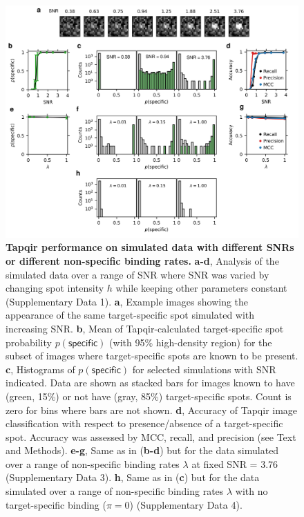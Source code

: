 \begin{figure}[h]
\centering
\includegraphics[width=1\textwidth]{figures/figure5/figure5.png}
\caption{\textbf{Tapqir performance on simulated data with different SNRs or different non-specific binding rates.} \textbf{a-d}, Analysis of the simulated data over a range of SNR where SNR was varied by changing spot intensity  $h$ while keeping other parameters constant (Supplementary Data 1). \textbf{a}, Example images showing the appearance of the same target-specific spot simulated with increasing SNR.   \textbf{b}, Mean of Tapqir-calculated target-specific spot probability $p(\mathsf{specific})$ (with 95\% high-density region) for the subset of images where target-specific spots  are known to be present. \textbf{c}, Histograms of $p(\mathsf{specific})$ for selected simulations with SNR indicated. Data are shown as stacked bars for images known to have (green, 15\%) or not have (gray, 85\%) target-specific spots.  Count is zero for bins where bars are not shown. \textbf{d}, Accuracy of Tapqir image classification with respect to presence/absence of a target-specific spot. Accuracy was assessed by MCC, recall, and precision (see Text and Methods). \textbf{e-g}, Same as in (\textbf{b-d}) but for the data simulated over a range of non-specific binding rates $\lambda$ at fixed SNR = 3.76 (Supplementary Data 3). \textbf{h}, Same as in (\textbf{c}) but for the data simulated over a range of non-specific binding rates $\lambda$ with no target-specific binding ($\pi = 0$) (Supplementary Data 4).}
\label{fig:tapqir_performance}
\end{figure}

